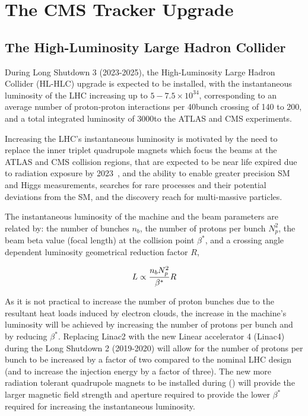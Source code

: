 \chapter{The CMS Tracker Upgrade}\label{chapter:tk-upgrade}
 
\section{The High-Luminosity Large Hadron Collider} \label{sec:hl-lhc}
During Long Shutdown 3 (2023-2025), the High-Luminosity Large Hadron Collider (HL-HLC) upgrade is expected to be installed, with the instantaneous luminosity of the LHC increasing up to $5-7.5 \times {10}^{34}$\percms, corresponding to an average number of proton-proton interactions per 40\MHz bunch crossing of 140 to 200, and a total integrated luminosity of 3000\fbinv to the ATLAS and CMS experiments.

Increasing the LHC's instantaneous luminosity is motivated by the need to replace the inner triplet quadrupole magnets which focus the beams at the ATLAS and CMS collision regions, that are expected to be near life expired due to radiation exposure by 2023~\cite{hl-lhc-prelim-design-report,CMSCollaboration:2015zni}, and the ability to enable greater precision SM and Higgs measurements, searches for rare processes and their potential deviations from the SM, and the discovery reach for multi-\TeV massive particles.

The instantaneous luminosity of the machine and the beam parameters are related by: the number of bunches $n_{b}$, the number of protons per bunch $N^{2}_{p}$, the beam beta value (focal length) at the collision point $\beta^{*}$, and a crossing angle dependent luminosity geometrical reduction factor $R$,

\begin{equation}
L \propto \frac{n_{b}N^{2}_{p}}{\beta^{*}} R \\
\label{eq:machineLumi}
\end{equation}

As it is not practical to increase the number of proton bunches due to the resultant heat loads induced by electron clouds, the increase in the machine's luminosity will be achieved by increasing the number of protons per bunch and by  reducing $\beta^{*}$.
Replacing Linac2 with the new Linear accelerator 4 (Linac4) during the Long Shutdown 2 (2019-2020) will allow for the number of protons per bunch to be increased by a factor of two compared to the nominal LHC design (and to increase the injection energy by a factor of three).
The new more radiation tolerant quadrupole magnets to be installed during () will provide the larger magnetic field strength and aperture required to provide the lower $\beta^{*}$ required for increasing the instantaneous luminosity. 

